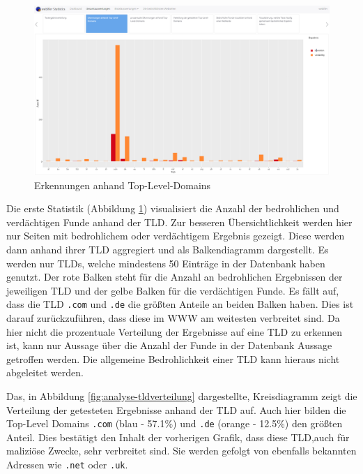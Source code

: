 \begin{figure}[H]
  \centering
  \includegraphics[width=\textwidth]{images/stats/tlderkennungen}
  \caption[Erkennungen anhand Top-Level-Domains]{Erkennungen anhand Top-Level-Domains\protect\footnotemark}
  \label{fig:analyse-tlderkennungen}
\end{figure}

Die erste Statistik (Abbildung \ref{fig:analyse-tlderkennungen}) visualisiert die Anzahl der bedrohlichen und verdächtigen Funde anhand der \ac{TLD}. Zur besseren Übersichtlichkeit werden hier nur Seiten mit bedrohlichem oder verdächtigem Ergebnis gezeigt. Diese werden dann anhand ihrer \ac{TLD} aggregiert und als Balkendiagramm dargestellt. Es werden nur \acp{TLD}, welche mindestens 50 Einträge in der Datenbank haben genutzt. Der rote Balken steht für die Anzahl an bedrohlichen Ergebnissen der jeweiligen \ac{TLD} und der gelbe Balken für die verdächtigen Funde. Es fällt auf, dass die \ac{TLD} \lstinline[style=eclipse]{.com} und \lstinline[style=eclipse]{.de} die größten Anteile an beiden Balken haben. Dies ist darauf zurückzuführen, dass diese im \ac{WWW} am weitesten verbreitet sind. Da hier nicht die prozentuale Verteilung der Ergebnisse auf eine \ac{TLD} zu erkennen ist, kann nur Aussage über die Anzahl der Funde in der Datenbank Aussage getroffen werden. Die allgemeine Bedrohlichkeit einer \ac{TLD} kann hieraus nicht abgeleitet werden.

Das, in Abbildung \ref{fig:analyse-tldverteilung} dargestellte, Kreisdiagramm zeigt die Verteilung der getesteten Ergebnisse anhand der \ac{TLD} auf. Auch hier bilden die Top-Level Domains \lstinline[style=eclipse]{.com} (blau - 57.1\%) und \lstinline[style=eclipse]{.de} (orange - 12.5\%) den größten Anteil. Dies bestätigt den Inhalt der vorherigen Grafik, dass diese \ac{TLD},auch für maliziöse Zwecke, sehr verbreitet sind. Sie werden gefolgt von ebenfalls bekannten Adressen wie \lstinline[style=eclipse]{.net} oder \lstinline[style=eclipse]{.uk}.

